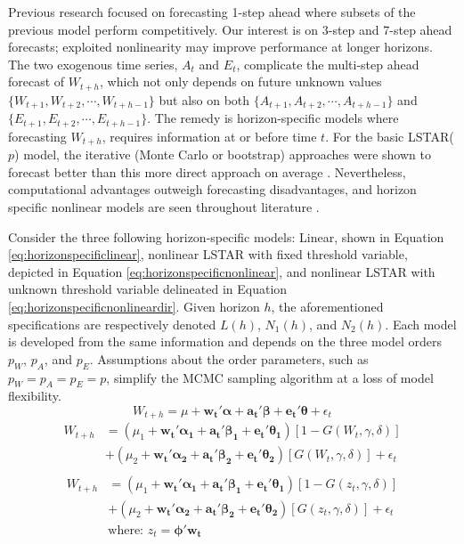 Previous research focused on forecasting 1-step ahead where subsets of the previous model perform competitively. Our interest is on 3-step and 7-step ahead forecasts; exploited nonlinearity may improve performance at longer horizons. The two exogenous time series, $A_t$ and $E_t$, complicate the multi-step ahead forecast of $W_{t+h}$, which not only depends on future unknown values $\{W_{t+1},W_{t+2},\cdots,W_{t+h-1}\}$ but also on both $\{A_{t+1},A_{t+2},\cdots,A_{t+h-1}\}$ and $\{E_{t+1},E_{t+2},\cdots,E_{t+h-1}\}$. The remedy is horizon-specific models where forecasting $W_{t+h}$, requires information at or before time $t$. For the basic LSTAR($p$) model, the iterative (Monte Carlo or bootstrap) approaches were shown to forecast better than this more direct approach on average \citep{Lin1994}. Nevertheless, computational advantages outweigh forecasting disadvantages, and horizon specific nonlinear models are seen throughout literature \citep{Stock1998a,Marcellino2006}.
 
Consider the three following horizon-specific models: Linear, shown in Equation \ref{eq:horizonspecificlinear}, nonlinear LSTAR with fixed threshold variable, depicted in Equation \ref{eq:horizonspecificnonlinear}, and nonlinear LSTAR with unknown threshold variable delineated in Equation \ref{eq:horizonspecificnonlineardir}. Given horizon $h$, the aforementioned specifications are respectively denoted $L(h)$, $N_1(h)$, and $N_2(h)$. Each model is developed from the same information and depends on the three model orders $p_W$, $p_A$, and $p_E$. Assumptions about the order parameters, such as $p_W=p_A=p_E=p$, simplify the MCMC sampling algorithm at a loss of model flexibility. 
  \begin{equation}
	\label{eq:horizonspecificlinear}
	W_{t+h}=\mu+\bm{w_t}'\bm{\alpha} + \bm{a_t}'\bm{\beta} +  \bm{e_t}'\bm{\theta}+\epsilon_t
 \end{equation} 
   \begin{equation}
   \begin{split}
	\label{eq:horizonspecificnonlinear}
	W_{t+h}&=(\mu_1+\bm{w_t}'\bm{\alpha_1} + \bm{a_t}'\bm{\beta_1} +  \bm{e_t}'\bm{\theta_1})[1-G(W_t,\gamma,\delta)]\\
	& + (\mu_2+\bm{w_t}'\bm{\alpha_2} + \bm{a_t}'\bm{\beta_2} +  \bm{e_t}'\bm{\theta_2})[G(W_t,\gamma,\delta)]+\epsilon_t\\
	\end{split}
 \end{equation}
     \begin{equation}
   \begin{split}
	\label{eq:horizonspecificnonlineardir}
	W_{t+h}&=(\mu_1+\bm{w_t}'\bm{\alpha_1} + \bm{a_t}'\bm{\beta_1} +  \bm{e_t}'\bm{\theta_1})[1-G(z_t,\gamma,\delta)]\\
	& + (\mu_2+\bm{w_t}'\bm{\alpha_2} + \bm{a_t}'\bm{\beta_2} +  \bm{e_t}'\bm{\theta_2})[G(z_t,\gamma,\delta)]+\epsilon_t\\
	& \textrm{where: } z_t=\bm{\phi}'\bm{w_t}\\
	\end{split}
 \end{equation}
 
